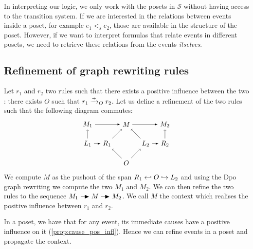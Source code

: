 
\bigskip

In interpreting our logic, we only work with the posets in $\mathcal{S}$ without having access to the transition system. If we are interested in the relations between events inside a poset, for example $e_1<_s e_2$, those are available in the structure of the poset. However, if we want to interpret formulas that relate events in different posets, we need to retrieve these relations from the events \emph{itselves}.


\subsection{Refinement of graph rewriting rules}

Let $r_1$ and $r_2$ two rules such that there exists a positive influence between the two : there exists $O$ such that $r_1 \mathrel{\xrightarrow{+}}_O r_2$. Let us define a refinement of the two rules
such that the following diagram commutes:
\[
\begin{tikzpicture} %
  \node (o) at (0,-1) {\(O\)};
  \node (p) at (0,1) {\(M\)};
  \node (r1) at (-1,0) {\(R_1\)};
  \node (l1) at (-2,0) {\(L_1\)};
  \node (l2) at (1,0) {\(L_2\)};
  \node (r2) at (2,0) {\(R_2\)};
  \node (m1) at (-2,1) {\(M_1\)};
  \node (m2) at (2,1) {\(M_2\)};
  \draw [->] (l1) -- (m1);
  \draw [->] (r2) -- (m2);
  \draw [->] (o) -- (r1);
  \draw [->] (o) -- (l2);
  \draw [->] (r1) -- (p);
  \draw [->] (l2) -- (p);
  \draw [>=latex, ->] (m1) -- (p);
  \draw [>=latex, ->] (p) -- (m2);
  \draw [>=latex, ->] (l1) -- (r1);
  \draw [>=latex, ->] (l2) -- (r2);
\end{tikzpicture}
\]
We compute $M$ as the pushout of the span $R_1\hookleftarrow O\hookrightarrow L_2$ and using the Dpo graph rewriting we compute the two $M_1$ and $M_2$. We can then refine the two rules to the sequence $M_1\action M\action M_2$. We call $M$ the context which realises the positive influence between $r_1$ and $r_2$.

In a poset, we have that for any event, its immediate causes have a positive influence on it (\autoref{prop:cause_pos_infl}). Hence we can refine events in a poset and propagate the context.


